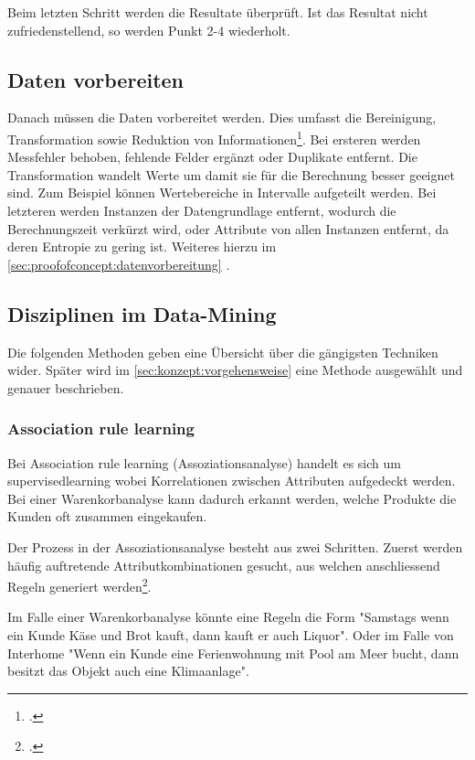 Beim letzten Schritt werden die Resultate überprüft. Ist das Resultat nicht zufriedenstellend, so werden Punkt 2-4 wiederholt.

\subsection{Daten vorbereiten}
\label{sec:recherche:dataminingtechniken:datenvorbereiten}

Danach müssen die Daten vorbereitet werden. Dies umfasst die Bereinigung, Transformation sowie Reduktion von Informationen\footcite{feature_selection_2017-01-04}. Bei ersteren werden Messfehler behoben, fehlende Felder ergänzt oder Duplikate entfernt. Die Transformation wandelt Werte um damit sie für die Berechnung besser geeignet sind. Zum Beispiel können Wertebereiche in Intervalle aufgeteilt werden. Bei letzteren werden Instanzen der Datengrundlage entfernt, wodurch die Berechnungszeit verkürzt wird, oder Attribute von allen Instanzen entfernt, da deren Entropie zu gering ist. Weiteres hierzu im \cref{sec:proofofconcept:datenvorbereitung} . 


\subsection{Disziplinen im Data-Mining}
\label{sec:recherche:dataminingtechniken:disziplinen}
Die folgenden Methoden geben eine Übersicht über die gängigsten Techniken wider. Später wird im \cref{sec:konzept:vorgehensweise}  eine Methode ausgewählt und genauer beschrieben. 

\subsubsection{Association rule learning}
\label{sec:recherche:dataminingtechniken:disziplinen:association}
Bei Association rule learning (Assoziationsanalyse) handelt es sich um \gls{supervisedlearning} wobei Korrelationen zwischen Attributen aufgedeckt werden. Bei einer Warenkorbanalyse kann dadurch erkannt werden, welche Produkte die Kunden oft zusammen eingekaufen.

Der Prozess in der Assoziationsanalyse besteht aus zwei Schritten. Zuerst werden häufig auftretende Attributkombinationen gesucht, aus welchen anschliessend Regeln generiert werden\footcite{association_rule_learning_2017-01-05}.

Im Falle einer Warenkorbanalyse könnte eine Regeln die Form "Samstags wenn ein Kunde Käse und Brot kauft, dann kauft er auch Liquor". Oder im Falle von Interhome "Wenn ein Kunde eine Ferienwohnung mit Pool am Meer bucht, dann besitzt das Objekt auch eine Klimaanlage".

